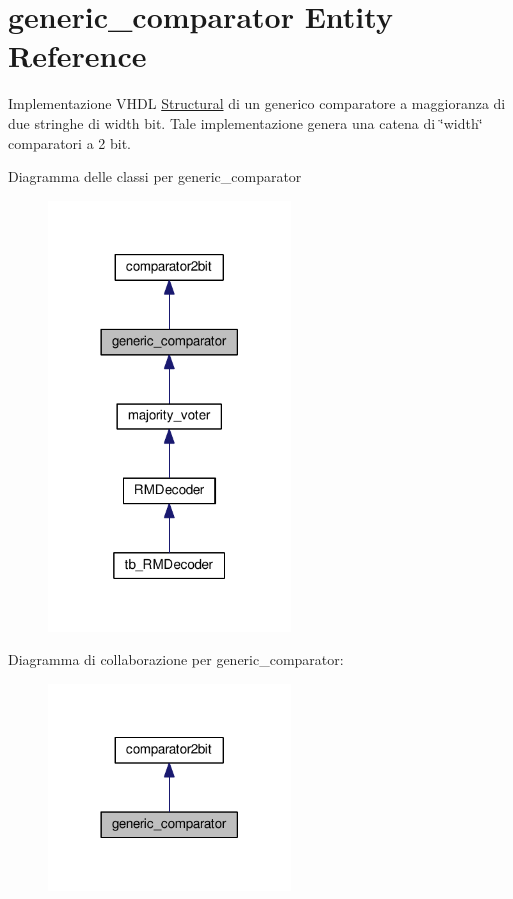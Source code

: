 \hypertarget{classgeneric__comparator}{\section{generic\+\_\+comparator Entity Reference}
\label{classgeneric__comparator}
}


Implementazione V\+H\+D\+L \hyperlink{classgeneric__comparator_1_1_structural}{Structural} di un generico comparatore a maggioranza di due stringhe di width bit. Tale implementazione genera una catena di \char`\"{}width\char`\"{} comparatori a 2 bit.  




Diagramma delle classi per generic\+\_\+comparator\nopagebreak
\begin{figure}[H]
\begin{center}
\leavevmode
\includegraphics[width=182pt]{classgeneric__comparator__inherit__graph}
\end{center}
\end{figure}


Diagramma di collaborazione per generic\+\_\+comparator\+:\nopagebreak
\begin{figure}[H]
\begin{center}
\leavevmode
\includegraphics[width=182pt]{classgeneric__comparator__coll__graph}
\end{center}
\end{figure}
